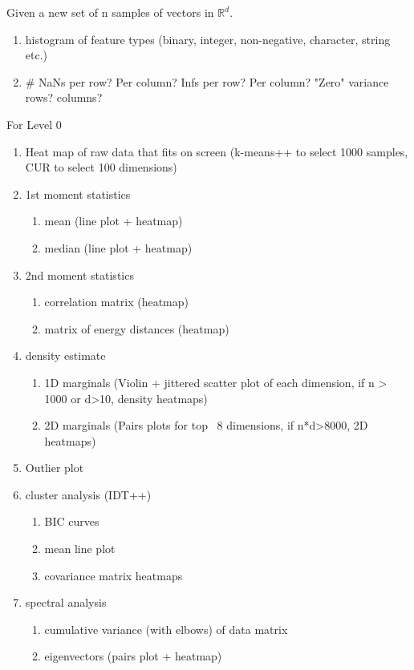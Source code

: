 \documentclass[simplex.tex]{subfiles}
\begin{document}
\begin{spacing}{0.5}
{\footnotesize
{\large Given a new set of n samples of vectors in $\mathbb{R}^d$.}
\begin{enumerate}
  \item histogram of feature types (binary, integer, non-negative, character, string etc.)
  \item \# NaNs per row? Per column? Infs per row? Per column? "Zero" variance rows? columns?
\end{enumerate}

{\large For Level 0}
\begin{enumerate}
  \item Heat map of raw data that fits on screen (k-means++ to select 1000 samples, CUR to select 100 dimensions)
  \item 1st moment statistics
  \begin{enumerate}
    \item mean (line plot + heatmap)
    \item median (line plot + heatmap)
  \end{enumerate}
  \item 2nd moment statistics
  \begin{enumerate}
    \item correlation matrix (heatmap)
    \item matrix of energy distances (heatmap)
  \end{enumerate}
  \item density estimate
  \begin{enumerate}
    \item 1D marginals (Violin + jittered scatter plot of each dimension,  if n > 1000 or d>10, density heatmaps)
    \item 2D marginals (Pairs plots for top ~8 dimensions, if n*d>8000, 2D heatmaps)
  \end{enumerate}
  \item Outlier plot 
  \item cluster analysis (IDT++)
  \begin{enumerate}
    \item BIC curves
    \item mean line plot
    \item covariance matrix heatmaps
  \end{enumerate}
  \item spectral analysis
  \begin{enumerate}
    \item cumulative variance (with elbows) of data matrix
    \item eigenvectors (pairs plot + heatmap)
  \end{enumerate}
\end{enumerate}

}
\end{spacing}
\end{document}
